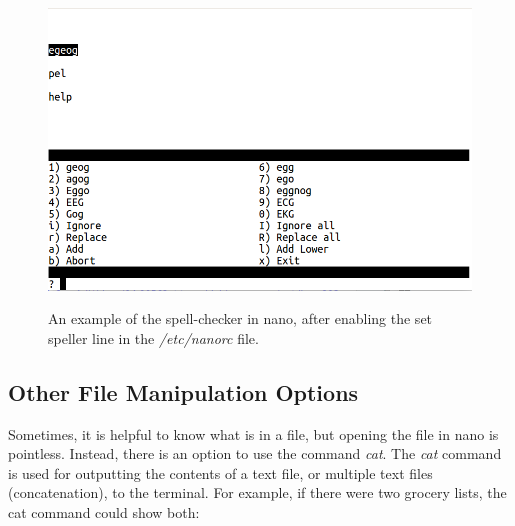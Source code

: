 \documentclass[12pt]{article}
\begin{document}
\begin{figure}[H]
\centering
\caption{An example of the spell-checker in nano, after enabling the set speller line in the \textit{/etc/nanorc} file.}
\includegraphics[width=\textwidth]{nano-spell}
\label{nano-s}
\end{figure}

\subsection{Other File Manipulation Options}

\quad\enskip\quad Sometimes, it is helpful to know what is in a file, but opening the file in nano is pointless. Instead, there is an option to use the command \textit{cat}. The \textit{cat} command is used for outputting the contents of a text file, or multiple text files (concatenation), to the terminal. For example, if there were two grocery lists, the cat command could show both:
\end{document}
